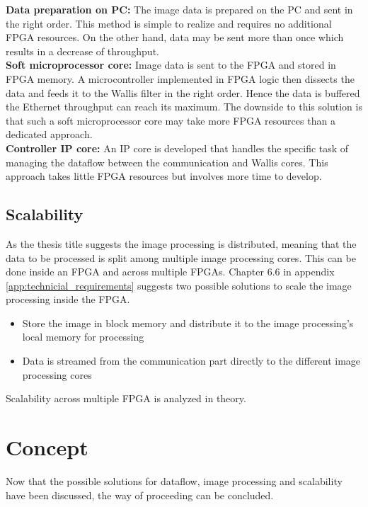 \textbf{Data preparation on PC:} The image data is prepared on the PC and sent
in the right order. This method is simple to realize and requires no
additional FPGA resources. On the other hand, data may be sent more than once
which results in a decrease of throughput.\\

\textbf{Soft microprocessor core:} Image data is sent to the FPGA and stored in
FPGA memory. A microcontroller implemented in FPGA logic then dissects the data
and feeds it to the Wallis filter in the right order. Hence the data is buffered
the Ethernet throughput can reach its maximum. The downside to this
solution
is that such a soft microprocessor core may take more FPGA resources than a
dedicated approach.\\

\textbf{Controller IP core:} An IP core is developed that handles the specific
task of managing the dataflow between the communication and Wallis cores. This
approach takes little FPGA resources but involves more time to develop.

\subsection{Scalability} \label{chapt:mission:scalability}
As the thesis title suggests the image processing is distributed, meaning that
the data to be processed is split among multiple image processing cores. This
can be done inside an FPGA and across multiple FPGAs.
Chapter 6.6 in appendix \ref{app:technicial_requirements} suggests two possible
solutions to scale the image processing inside the FPGA.
\begin{itemize}
    \item Store the image in block memory and distribute it to the image
    processing's local memory for processing
    \item Data is streamed from the communication part directly to the different
    image processing cores
\end{itemize}

Scalability across multiple FPGA is analyzed in theory.

%
%

\section{Concept} \label{chapt:mission:concept}
Now that the possible solutions for dataflow, image processing and scalability
have been discussed, the way of proceeding can be concluded.\\


